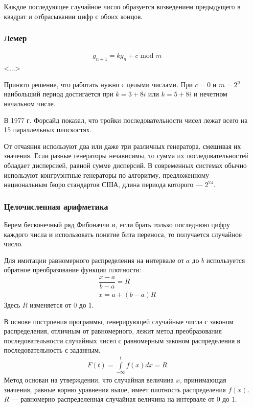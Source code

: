 Каждое последующее случайное число образуется возведением предыдущего в квадрат и отбрасывании цифр с обоих концов.

\subsubsection{Лемер}
%
\begin{gather*}
    g_{n+1} = kg_n + c\text{ mod }m
\end{gather*}
%
<...>

Принято решение, что работать нужно с целыми числами. При ${c = 0}$ и ${m = 2^n}$ наибольший период достигается при ${k = 3+8i}$ или ${k=5+8i}$ и нечетном начальном числе.

В 1977 г. Форсайд показал, что тройки последовательности чисел лежат всего на 15
параллельных плоскостях.

От отчаяния используют два или даже три различных генератора, смешивая их значения. Если разные генераторы независимы, то сумма их последовательностей обладает дисперсией, равной сумме дисперсий. В современных системах обычно используют конгруэнтные генераторы по алгоритму, предложенному национальным бюро стандартов США, длина периода которого --- $2^{24}$.

\subsubsection{Целочисленная арифметика}

Берем бесконечный ряд Фибоначчи и, если брать только последнюю цифру каждого числа и использовать понятие бита переноса, то получается случайное число.

Для имитации равномерного распределения на интервале от $a$ до $b$ используется обратное преобразование функции плотности:
%
\begin{gather*}
    \dfrac{x-a}{b-a} = R\\
    x = a + (b-a)R
\end{gather*}
%
Здесь $R$ изменяется от 0 до 1.

В основе построения программы, генерирующей случайные числа с законом распределения, отличным от равномерного, лежит метод преобразования последовательности случайных чисел с равномерным законом распределения в последовательность с заданным.
%
\begin{gather*}
    F(t) = \int\limits_{-\infty}^{t} f(x)dx = R
\end{gather*}
%
Метод основан на утверждении, что случайная величина $x$, принимающая значения, равные корню уравнения выше, имеет плотность распределения $f(x)$. $R$ --- равномерно распределенная случайная величина на интервале от 0 до 1.


